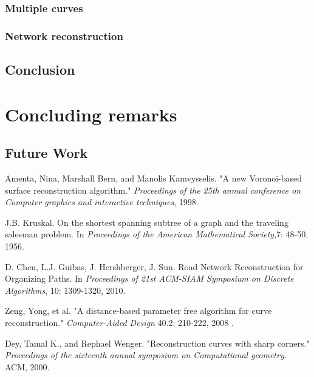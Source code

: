 \documentclass[11pt]{article}
\begin{document}
\subsubsection{Multiple curves}
\subsubsection{Network reconstruction}

\subsection{Conclusion}

\section{Concluding remarks}


\subsection{Future Work}


\begin{thebibliography}{50}


Amenta, Nina, Marshall Bern, and Manolis Kamvysselis. 
"A new Voronoi-based surface reconstruction algorithm." 
\textit{Proceedings of the 25th annual conference on Computer graphics and interactive techniques}, 1998.

J.B. Kruskal.
On the shortest spanning subtree of a graph and the traveling salesman problem.
In \emph{Proceedings of the American Mathematical Society},7: 48-50, 1956.

D. Chen, L.J. Guibas, J. Hershberger, J. Sun.
Road Network Reconstruction for Organizing Paths.
In \emph{Proceedings  of  21st  ACM-SIAM  Symposium  on  Discrete  Algorithms}, 10: 1309-1320, 2010.

Zeng, Yong, et al. "A distance-based parameter free algorithm for curve reconstruction." \textit{Computer-Aided Design} 40.2: 210-222, 2008 .

Dey, Tamal K., and Rephael Wenger. "Reconstruction curves with sharp corners." \textit{Proceedings of the sixteenth annual symposium on Computational geometry.} ACM, 2000.




\end{thebibliography}
\end{document}
